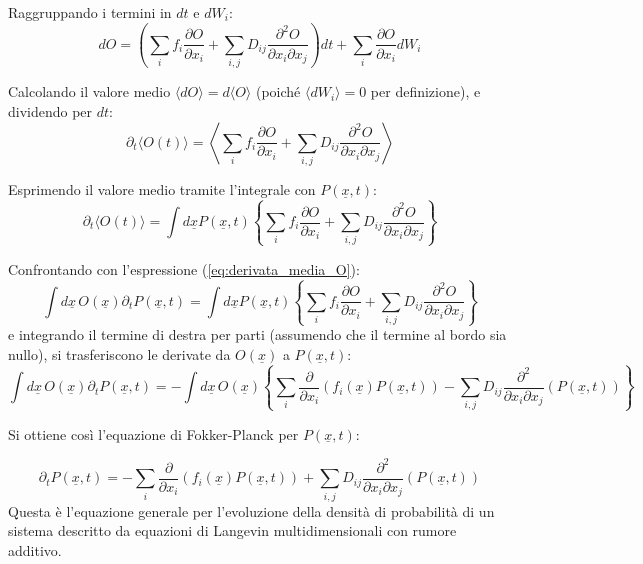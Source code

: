 Raggruppando i termini in $dt$ e $dW_i$:
\begin{equation}
dO = \left( \sum_i f_i \frac{\partial O}{\partial x_i} + \sum_{i,j} D_{ij} \frac{\partial^2 O}{\partial x_i \partial x_j} \right) dt + \sum_i \frac{\partial O}{\partial x_i} dW_i
\end{equation}

Calcolando il valore medio $\langle dO \rangle = d\langle O \rangle$ (poiché $\langle dW_i \rangle = 0$ per definizione), e dividendo per $dt$:
\begin{equation}
\partial_t \langle O(t) \rangle = \left\langle \sum_i f_i \frac{\partial O}{\partial x_i} + \sum_{i,j} D_{ij} \frac{\partial^2 O}{\partial x_i \partial x_j} \right\rangle
\end{equation}

Esprimendo il valore medio tramite l'integrale con $P(\underline{x},t)$:
\begin{equation}
\partial_t \langle O(t) \rangle = \int d\underline{x} P(\underline{x},t) \left\{ \sum_i f_i \frac{\partial O}{\partial x_i} + \sum_{i,j} D_{ij} \frac{\partial^2 O}{\partial x_i \partial x_j} \right\}
\end{equation}

Confrontando con l'espressione (\ref{eq:derivata_media_O}):
\begin{equation}
\int d\underline{x} \, O(\underline{x}) \partial_t P(\underline{x}, t) = \int d\underline{x} P(\underline{x},t) \left\{ \sum_i f_i \frac{\partial O}{\partial x_i} + \sum_{i,j} D_{ij} \frac{\partial^2 O}{\partial x_i \partial x_j} \right\}
\end{equation}
e integrando il termine di destra per parti (assumendo che il termine al bordo sia nullo), si trasferiscono le derivate da $O(\underline{x})$ a $P(\underline{x},t)$:
\begin{equation}
\int d\underline{x} \, O(\underline{x}) \partial_t P(\underline{x}, t) = - \int d\underline{x} \, O(\underline{x}) \left \{ \sum_i \frac{\partial}{\partial x_i} (f_i(\underline{x}) P(\underline{x},t)) - \sum_{i,j} D_{ij}\frac{\partial^2}{\partial x_i\partial x_j} \left( P(\underline{x},t)\right) \right\}
\end{equation}

Si ottiene così l'equazione di Fokker-Planck per $P(\underline{x},t)$:
\begin{tcolorbox}[
    colback=colorA!5,      
    colframe=colorA,       
    arc=3mm,               
    boxrule=1.2pt
]
\begin{equation}
\partial_t P(\underline{x},t) = - \sum_i \frac{\partial}{\partial x_i} (f_i(\underline{x}) P(\underline{x},t)) + \sum_{i,j} D_{ij}\frac{\partial^2}{\partial x_i\partial x_j} \left( P(\underline{x},t)\right)
\end{equation}
Questa è l'equazione generale per l'evoluzione della densità di probabilità di un sistema descritto da equazioni di Langevin multidimensionali con rumore additivo.
\\
\end{tcolorbox}

